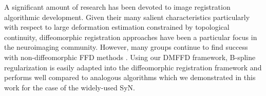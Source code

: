 \documentclass{frontiersSCNS}
\begin{document}
A significant amount of research has been devoted to image registration
algorithmic development.  Given their many salient characteristics particularly with
respect to large deformation estimation constrained by topological 
continuity, diffeomorphic registration
approaches have been a particular focus in the neuroimaging community.
However, many groups continue to find success with non-diffeomorphic
FFD methods
\citep[e.g.][]{rueckert1999,klein2010}.  Using our DMFFD framework, 
B-spline regularization is easily adapted into the diffeomorphic registration 
framework and performs well compared to analogous algorithms which we demonstrated 
in this work for the case of the widely-used SyN.










%









\end{document}

